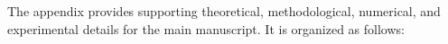 



















The appendix provides supporting theoretical, methodological, numerical, and experimental details for the main manuscript. It is organized as follows:

